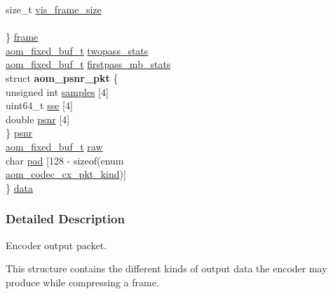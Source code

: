 \begin{DoxyCompactItemize}
\begin{tabbing}
\>\>size\_t \hyperlink{structaom__codec__cx__pkt_a9219d4191e4141bd806ab5b55fb93f9d}{vis\_frame\_size}\\
\>\>\\
\>\} \hyperlink{structaom__codec__cx__pkt_a4180a6ae59b0d295bc915d4689df4cb0}{frame}\\
\>\hyperlink{group__encoder_ga85cca9fad6bc25c667f013a39c607174}{aom\_fixed\_buf\_t} \hyperlink{structaom__codec__cx__pkt_a40d469839bcd8195c3c8e80db6561dbb}{twopass\_stats}\\
\>\hyperlink{group__encoder_ga85cca9fad6bc25c667f013a39c607174}{aom\_fixed\_buf\_t} \hyperlink{structaom__codec__cx__pkt_a8ce39bab39da5a247a27e42eb78386e2}{firstpass\_mb\_stats}\\
\>struct {\bfseries aom\_psnr\_pkt} \{\\
\>\>unsigned int \hyperlink{structaom__codec__cx__pkt_ae506ecf56b35d126ac24eb2c3ba7bb07}{samples} \mbox{[}4\mbox{]}\\
\>\>uint64\_t \hyperlink{structaom__codec__cx__pkt_afe2d06d74e3fae7d04fdde4e7d1ae455}{sse} \mbox{[}4\mbox{]}\\
\>\>double \hyperlink{structaom__codec__cx__pkt_a3a38e942aa0da463260a05eb05f51762}{psnr} \mbox{[}4\mbox{]}\\
\>\} \hyperlink{structaom__codec__cx__pkt_a95d437114a001414f864e086ca6ab152}{psnr}\\
\>\hyperlink{group__encoder_ga85cca9fad6bc25c667f013a39c607174}{aom\_fixed\_buf\_t} \hyperlink{structaom__codec__cx__pkt_a4fc6ea5e240c5df0acbf77aa2fe5ec6f}{raw}\\
\>char \hyperlink{structaom__codec__cx__pkt_a96b7e6cac7b6952edaba7e38733a6c4e}{pad} \mbox{[}128 -\/ sizeof(enum \\
\>\>\hyperlink{group__encoder_gafeb69da4a9649a54e805f59c26d8dfed}{aom\_codec\_cx\_pkt\_kind})\mbox{]}\\
\} \hyperlink{structaom__codec__cx__pkt_afb379cd4bfa7692d1d6e85f4e4b2b410}{data}\\

\end{tabbing}\end{DoxyCompactItemize}


\subsubsection{Detailed Description}
Encoder output packet. 

This structure contains the different kinds of output data the encoder may produce while compressing a frame. 

